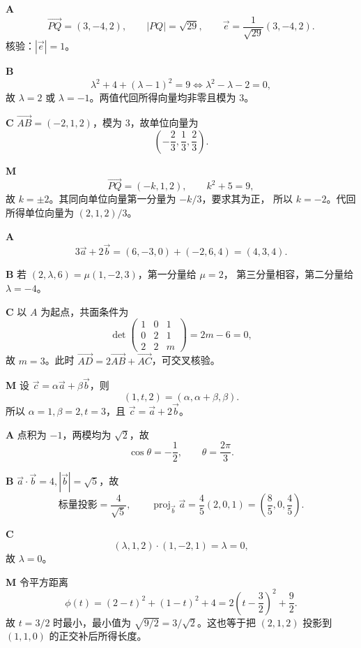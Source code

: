 \begin{solutionBox}
\textbf{A}\quad
\[
\overrightarrow{PQ}=(3,-4,2),\qquad |PQ|=\sqrt{29},\qquad
\vec e=\frac1{\sqrt{29}}(3,-4,2).
\]
核验：\(|\vec e|=1\)。

\textbf{B}\quad
\[
\lambda^2+4+(\lambda-1)^2=9
\Longleftrightarrow \lambda^2-\lambda-2=0,
\]
故 \(\lambda=2\) 或 \(\lambda=-1\)。两值代回所得向量均非零且模为 \(3\)。

\textbf{C}\quad
\(\overrightarrow{AB}=(-2,1,2)\)，模为 \(3\)，故单位向量为
\[
\left(-\frac23,\frac13,\frac23\right).
\]

\textbf{M}\quad
\[
\overrightarrow{PQ}=(-k,1,2),\qquad k^2+5=9,
\]
故 \(k=\pm2\)。其同向单位向量第一分量为 \(-k/3\)，要求其为正，
所以 \(k=-2\)。代回所得单位向量为 \((2,1,2)/3\)。
\end{solutionBox}

\begin{solutionBox}
\textbf{A}\quad
\[
3\vec a+2\vec b=(6,-3,0)+(-2,6,4)=(4,3,4).
\]

\textbf{B}\quad
若 \((2,\lambda,6)=\mu(1,-2,3)\)，第一分量给 \(\mu=2\)，
第三分量相容，第二分量给 \(\lambda=-4\)。

\textbf{C}\quad
以 \(A\) 为起点，共面条件为
\[
\det\begin{pmatrix}1&0&1\\0&2&1\\2&2&m\end{pmatrix}
=2m-6=0,
\]
故 \(m=3\)。此时
\(\overrightarrow{AD}=2\overrightarrow{AB}+\overrightarrow{AC}\)，可交叉核验。

\textbf{M}\quad
设 \(\vec c=\alpha\vec a+\beta\vec b\)，则
\[
(1,t,2)=(\alpha,\alpha+\beta,\beta).
\]
所以 \(\alpha=1,\beta=2,t=3\)，且
\(\vec c=\vec a+2\vec b\)。
\end{solutionBox}

\begin{solutionBox}
\textbf{A}\quad
点积为 \(-1\)，两模均为 \(\sqrt2\)，故
\[
\cos\theta=-\frac12,\qquad \theta=\frac{2\pi}{3}.
\]

\textbf{B}\quad
\(\vec a\cdot\vec b=4,|\vec b|=\sqrt5\)，故
\[
\text{标量投影}=\frac4{\sqrt5},\qquad
\operatorname{proj}_{\vec b}\vec a
=\frac45(2,0,1)=\left(\frac85,0,\frac45\right).
\]

\textbf{C}\quad
\[
(\lambda,1,2)\cdot(1,-2,1)=\lambda=0,
\]
故 \(\lambda=0\)。

\textbf{M}\quad
令平方距离
\[
\phi(t)=(2-t)^2+(1-t)^2+4
=2\left(t-\frac32\right)^2+\frac92.
\]
故 \(t=3/2\) 时最小，最小值为
\(\sqrt{9/2}=3/\sqrt2\)。这也等于把 \((2,1,2)\) 投影到
\((1,1,0)\) 的正交补后所得长度。
\end{solutionBox}

